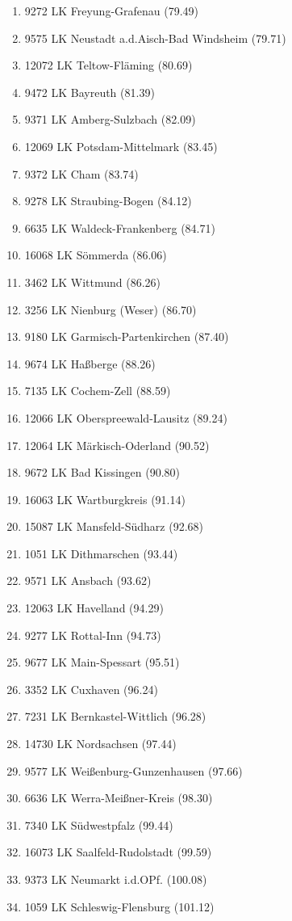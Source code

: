 \begin{enumerate}[itemsep=-6mm]
\item 9272 LK Freyung-Grafenau (79.49)
\item 9575 LK Neustadt a.d.Aisch-Bad Windsheim (79.71)
\item 12072 LK Teltow-Fläming (80.69)
\item 9472 LK Bayreuth (81.39)
\item 9371 LK Amberg-Sulzbach (82.09)
\item 12069 LK Potsdam-Mittelmark (83.45)
\item 9372 LK Cham (83.74)
\item 9278 LK Straubing-Bogen (84.12)
\item 6635 LK Waldeck-Frankenberg (84.71)
\item 16068 LK Sömmerda (86.06)
\item 3462 LK Wittmund (86.26)
\item 3256 LK Nienburg (Weser) (86.70)
\item 9180 LK Garmisch-Partenkirchen (87.40)
\item 9674 LK Haßberge (88.26)
\item 7135 LK Cochem-Zell (88.59)
\item 12066 LK Oberspreewald-Lausitz (89.24)
\item 12064 LK Märkisch-Oderland (90.52)
\item 9672 LK Bad Kissingen (90.80)
\item 16063 LK Wartburgkreis (91.14)
\item 15087 LK Mansfeld-Südharz (92.68)
\item 1051 LK Dithmarschen (93.44)
\item 9571 LK Ansbach (93.62)
\item 12063 LK Havelland (94.29)
\item 9277 LK Rottal-Inn (94.73)
\item 9677 LK Main-Spessart (95.51)
\item 3352 LK Cuxhaven (96.24)
\item 7231 LK Bernkastel-Wittlich (96.28)
\item 14730 LK Nordsachsen (97.44)
\item 9577 LK Weißenburg-Gunzenhausen (97.66)
\item 6636 LK Werra-Meißner-Kreis (98.30)
\item 7340 LK Südwestpfalz (99.44)
\item 16073 LK Saalfeld-Rudolstadt (99.59)
\item 9373 LK Neumarkt i.d.OPf. (100.08)
\item 1059 LK Schleswig-Flensburg (101.12)

\end{enumerate}
